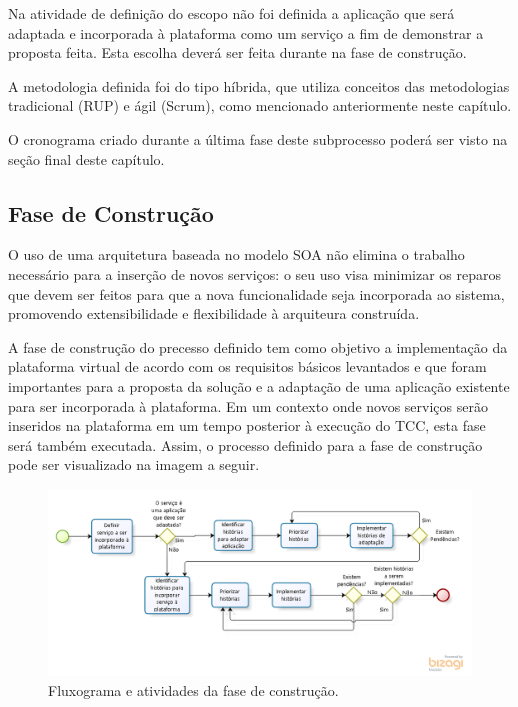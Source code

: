 Na atividade de definição do escopo não foi definida a aplicação que será adaptada e incorporada à plataforma como um serviço a fim de demonstrar a proposta feita. Esta escolha deverá ser feita durante na fase de construção.

A metodologia definida foi do tipo híbrida, que utiliza conceitos das metodologias tradicional (RUP) e ágil (Scrum), como mencionado anteriormente neste capítulo.

O cronograma criado durante a última fase deste subprocesso poderá ser visto na seção final deste capítulo.


\subsection{Fase de Construção}
O uso de uma arquitetura baseada no modelo SOA não elimina o trabalho necessário para a inserção de novos serviços: o seu uso visa minimizar os reparos que devem ser feitos para que a nova funcionalidade seja incorporada ao sistema, promovendo extensibilidade e flexibilidade à arquiteura construída.

A fase de construção do precesso definido tem como objetivo a implementação da plataforma virtual de acordo com os requisitos básicos levantados e que foram importantes para a proposta da solução e a adaptação de uma aplicação existente para ser incorporada à plataforma. Em um contexto onde novos serviços serão inseridos na plataforma em um tempo posterior à execução do TCC, esta fase será também executada. Assim, o processo definido para a fase de construção pode ser visualizado na imagem a seguir.

\begin{figure}[htb]
\centering
\includegraphics[width=1\textwidth]{figuras/subprocesso_implementacao.PNG}
\caption{Fluxograma e atividades da fase de construção.}
\label{subprocesso_implementacao}
\end{figure}

